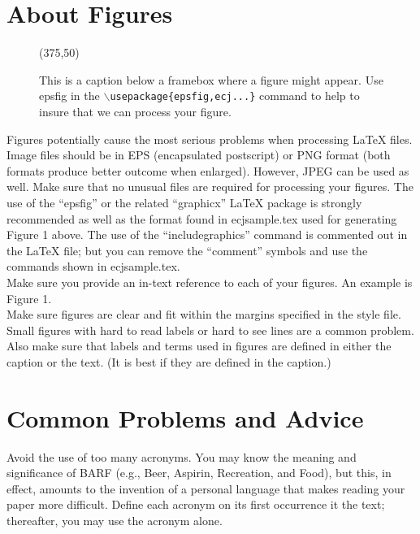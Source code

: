 \documentclass[twoside]{article}
\begin{document}
\section{About Figures}

\begin{figure}[t]
\begin{center}
\centerline{
\framebox(375,50)
}
\end{center}
\caption{This is a caption below a framebox where a figure might appear.  
         Use epsfig in the {\tt $\backslash$usepackage\{epsfig,ecj...\}} 
         command to help to insure that we can process your figure.}
\label{graph1}
\end{figure}

Figures potentially cause the most serious problems when processing \LaTeX{}
files. Image files should be in EPS (encapsulated postscript) or 
PNG format (both formats produce better outcome when enlarged). However, JPEG 
can be used as well. Make sure that no unusual files are required for 
processing your figures.
The use of the ``epsfig'' or the related ``graphicx'' \LaTeX{} package is 
strongly recommended as well as the
format found in ecjsample.tex used for generating Figure 1 above.
The use of the ``includegraphics'' command is commented out in the \LaTeX{} 
file;
but you can remove the ``comment'' symbols and use the
commands shown in ecjsample.tex.\\

Make sure you provide an in-text reference to each of your figures.  An 
example is Figure 1.\\

Make sure figures are clear and fit within the margins specified in the 
style file.  Small figures with hard to read labels or hard to see lines are 
a common problem.  Also make sure that labels and terms used in figures are
defined in either the caption or the text. (It is best if they
are defined in the caption.)

\section{Common Problems and Advice}

Avoid the use of too many acronyms. You may know the meaning and 
significance of BARF (e.g., Beer, Aspirin, Recreation, and Food), but this, 
in effect, amounts to the invention of a personal language that makes 
reading your paper more difficult.  Define each acronym on its first 
occurrence it the text; thereafter, you may use the acronym alone.\\
\end{document}
